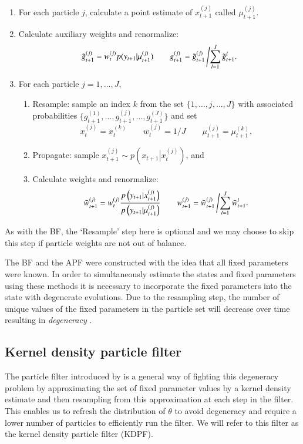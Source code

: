 \documentclass{elsarticle}
\begin{document}
\begin{enumerate}
\item For each particle $j$, calculate a point estimate of $x_{t+1}^{(j)}$ called $\mu_{t+1}^{(j)}$.  %
\item Calculate auxiliary weights and renormalize:
\[ \tilde{g}_{t+1}^{(j)} = w_t^{(j)} p(y_{t+1}|\mu_{t+1}^{(j)}) \qquad g_{t+1}^{(j)} = \tilde{g}_{t+1}^{(j)}\left/\sum_{l=1}^J \tilde{g}_{t+1}^l.\right. \]
\item For each particle $j=1,\ldots,J$,
	\begin{enumerate}
    \item Resample: sample an index $k$ from the set $\{1,\ldots,j,\ldots,J\}$ with associated probabilities $\{g_{t+1}^{(1)},\ldots,g_{t+1}^{(j)},\ldots,g_{t+1}^{(J)}\}$ and set
         \[ x_t^{(j)} = x_t^{(k)} \qquad w_t^{(j)} = 1 / J \qquad \mu_{t+1}^{(j)} = \mu_{t+1}^{(k)}, \]
	\item Propagate: sample $x_{t+1}^{(j)} \sim p\left(\left. x_{t+1}\right|x_t^{(j)}\right)$, and
	\item Calculate weights and renormalize:
\[ \tilde{w}_{t+1}^{(j)} = w_t^{(j)}\frac{p\left(y_{t+1}|x_{t+1}^{(j)}\right)}{p\left(y_{t+1}|\mu_{t+1}^{(j)}\right)} \qquad w_{t+1}^{(j)} = \tilde{w}_{t+1}^{(j)}\left/\sum_{l=1}^J \tilde{w}_{t+1}^l. \right. \]
	\end{enumerate}
\end{enumerate}

\noindent As with the BF, the `Resample' step here is optional and we may choose to skip this step if particle weights are not out of balance.

The BF and the APF were constructed with the idea that all fixed parameters were known. In order to simultaneously estimate the states and fixed parameters using these methods it is necessary to incorporate the fixed parameters into the state with degenerate evolutions. Due to the resampling step, the number of unique values of the fixed parameters in the particle set will decrease over time resulting in \emph{degeneracy} \citep{Liu:West:comb:2001}.

\subsection{Kernel density particle filter \label{sec:kd}}

The particle filter introduced by \cite{Liu:West:comb:2001} is a general way of fighting this degeneracy problem by approximating the set of fixed parameter values by a kernel density estimate and then resampling from this approximation at each step in the filter. This enables us to refresh the distribution of $\theta$ to avoid degeneracy and require a lower number of particles to efficiently run the filter. We will refer to this filter as the kernel density particle filter (KDPF).
\end{document}
